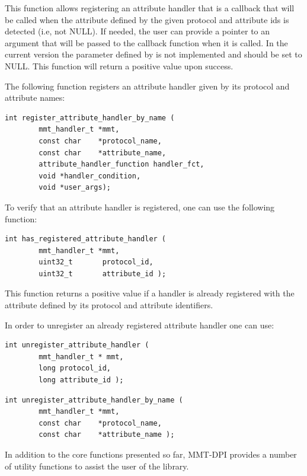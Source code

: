 This function allows registering an attribute handler that is a callback that will be called when the attribute defined by the given protocol and attribute ids is detected (i.e, not NULL). If needed, the user can provide a pointer to an argument that will be passed to the callback function when it is called. In the current version the parameter defined by  is not implemented and should be set to NULL. This function will return a positive value upon success.


The following function registers an attribute handler given by its protocol and attribute names:


\begin{lstlisting}[style=Cpp]
int register_attribute_handler_by_name (
        mmt_handler_t *mmt,
        const char    *protocol_name,
        const char    *attribute_name,
        attribute_handler_function handler_fct,
        void *handler_condition,
        void *user_args);
\end{lstlisting}

To verify that an attribute handler is registered, one can use the following function:

\begin{lstlisting}[style=Cpp]
int has_registered_attribute_handler (
        mmt_handler_t *mmt,
        uint32_t       protocol_id,
        uint32_t       attribute_id );
\end{lstlisting}

This function returns a positive value if a handler is already registered with the attribute defined by its protocol and attribute identifiers.

In order to unregister an already registered attribute handler one can use:

\begin{lstlisting}[style=Cpp]
int unregister_attribute_handler (
        mmt_handler_t * mmt,
        long protocol_id,
        long attribute_id );
\end{lstlisting}

\begin{lstlisting}[style=Cpp]
int unregister_attribute_handler_by_name (
        mmt_handler_t *mmt,
        const char    *protocol_name,
        const char    *attribute_name );
\end{lstlisting}


In addition to the core functions presented so far, MMT-DPI provides a number of utility functions to assist the user of the library. 

